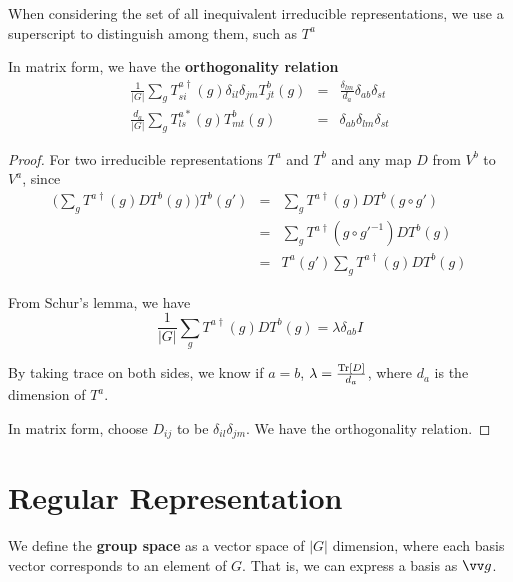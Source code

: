 \documentclass[12pt]{book}
\begin{document}
	When considering the set of all inequivalent irreducible representations, we use a superscript to distinguish among them, such as $T^a$
	
	\begin{lemma}
		In matrix form, we have the \textbf{orthogonality relation}
	\begin{eqnarray}
		\frac 1{|G|}\sum_gT^{a\dagger}_{si}(g)\delta_{il}\delta_{jm}T^b_{jt}(g)&=&\frac{\delta_{lm}}{d_a}\delta_{ab}\delta_{st}\\
		\frac {d_a}{|G|}\sum_gT^{a*}_{ls}(g)T^b_{mt}(g)&=&\delta_{ab}\delta_{lm}\delta_{st}\label{eqn:orthogonal}
	\end{eqnarray}
	\end{lemma}
	\begin{proof}
	For two irreducible representations $T^a$ and $T^b$ and any map $D$ from $V^b$ to $V^a$, since
	\begin{eqnarray}
		\big(\sum_gT^{a\dagger}(g)DT^b(g)\big)T^b(g')&=&\sum_gT^{a\dagger}(g)DT^b(g\circ g')\\
		&=&\sum_gT^{a\dagger}(g\circ g'^{-1})DT^b(g)\\
		&=&T^a(g')\sum_gT^{a\dagger}(g)DT^b(g)
	\end{eqnarray}
	
	From Schur's lemma, we have 
	\begin{equation}
		\frac 1{|G|}\sum_gT^{a\dagger}(g)DT^b(g)=\lambda\delta_{ab}I
	\end{equation}	
	
	By taking trace on both sides, we know if $a=b$, $\lambda=\frac{{\rm Tr}[D]}{d_a}$, where $d_a$ is the dimension of $T^a$.
	
	In matrix form, choose $D_{ij}$ to be $\delta_{il}\delta_{jm}$. We have the orthogonality relation.
	\end{proof} 	
	
	\section{Regular Representation}
	\begin{definition}
		We define the {\bf group space} as a vector space of $|G|$ dimension, where each basis vector corresponds to an element of $G$. That is, we can express a basis as $\vv g$.
	\end{definition}
	
\end{document}
